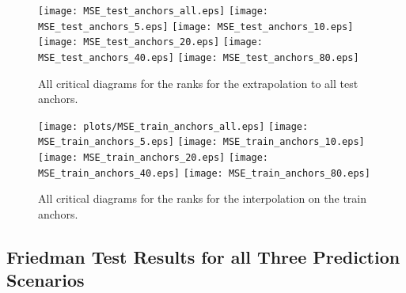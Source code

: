 \documentclass{article}
\begin{document}
\begin{figure}[h]
    \centering
    \texttt{[image: MSE\_test\_anchors\_all.eps]}
    \texttt{[image: MSE\_test\_anchors\_5.eps]}
    \texttt{[image: MSE\_test\_anchors\_10.eps]}
    \texttt{[image: MSE\_test\_anchors\_20.eps]}
    \texttt{[image: MSE\_test\_anchors\_40.eps]}
    \texttt{[image: MSE\_test\_anchors\_80.eps]}
    \caption{All critical diagrams for the ranks for the extrapolation to all test anchors. }
\end{figure}

\begin{figure}[h]
    \centering
    \texttt{[image: plots/MSE\_train\_anchors\_all.eps]}
    \texttt{[image: MSE\_train\_anchors\_5.eps]}
    \texttt{[image: MSE\_train\_anchors\_10.eps]}
    \texttt{[image: MSE\_train\_anchors\_20.eps]}    \texttt{[image: MSE\_train\_anchors\_40.eps]}
    \texttt{[image: MSE\_train\_anchors\_80.eps]}
    \caption{All critical diagrams for the ranks for the interpolation on the train anchors.  }
\end{figure}

\FloatBarrier

\subsection{Friedman Test Results for all Three Prediction Scenarios}
\end{document}

